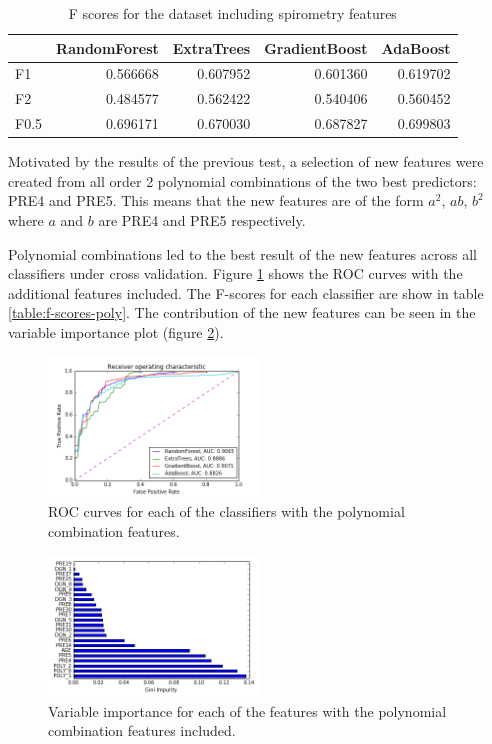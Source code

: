 \documentclass[journal]{IEEEtran}
\begin{document}
\begin{table}
\caption{F scores for the dataset including spirometry features}
\begin{tabular}{lrrrr}
{} &  RandomForest &  ExtraTrees &  GradientBoost &  AdaBoost \\
\hline
F1   &      0.566668 &    0.607952 &       0.601360 &  0.619702 \\
F2   &      0.484577 &    0.562422 &       0.540406 &  0.560452 \\
F0.5 &      0.696171 &    0.670030 &       0.687827 &  0.699803 \\
\end{tabular}
\label{table:f-scores-spiro}
\end{table}

Motivated by the results of the previous test, a selection of new features were created from all order 2 polynomial combinations of the two best predictors: PRE4 and PRE5. This means that the new features are of the form $a^2$, $ab$, $b^2$ where $a$ and $b$ are PRE4 and PRE5 respectively. 

Polynomial combinations led to the best result of the new features across all classifiers under cross validation. Figure \ref{fig:roc-poly-features} shows the ROC curves with the additional features included. The F-scores for each classifier are show in table \ref{table:f-scores-poly}. The contribution of the new features can be seen in the variable importance plot (figure \ref{fig:importance-poly-features}).

\begin{figure}[!t]
\centering
\includegraphics[width=0.5\textwidth]{../src/img/roc_poly_features.png}
\caption{ROC curves for each of the classifiers with the polynomial combination features.}
\label{fig:roc-poly-features}
\end{figure}

\begin{figure}[!t]
\centering
\includegraphics[width=0.5\textwidth]{../src/img/importance_poly_features.png}
\caption{Variable importance for each of the features with the polynomial combination features included.}
\label{fig:importance-poly-features}
\end{figure}
\end{document}
